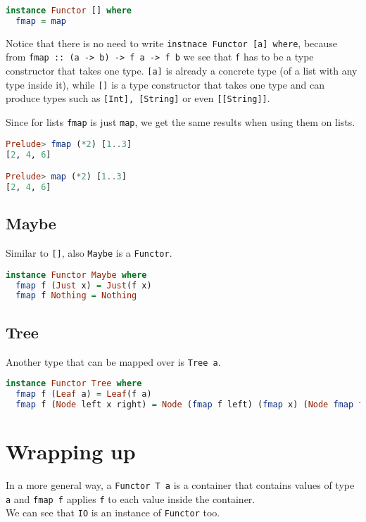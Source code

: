 \begin{lstlisting}[language=haskell]
instance Functor [] where
  fmap = map
\end{lstlisting}

Notice that there is no need to write \texttt{instnace Functor [a] where}, because from \texttt{fmap :: (a -> b) -> f a -> f b} we see that \texttt{f} has to be a type constructor that takes one type. \texttt{[a]} is already a concrete type (of a list with any type inside it), while \texttt{[]} is a type constructor that takes one type and can produce types such as \texttt{[Int], [String]} or even \texttt{[[String]]}.
\linebreak \linebreak

Since for lists \texttt{fmap} is just \texttt{map}, we get the same results when using them on lists. 

\begin{lstlisting}[language=haskell]
Prelude> fmap (*2) [1..3]
[2, 4, 6]

Prelude> map (*2) [1..3]
[2, 4, 6]
\end{lstlisting}


\subsection{Maybe}
Similar to \texttt{[]}, also \texttt{Maybe} is a \texttt{Functor}.

\begin{lstlisting}[language=haskell]
instance Functor Maybe where
  fmap f (Just x) = Just(f x)
  fmap f Nothing = Nothing 
\end{lstlisting}


\subsection{Tree}
Another type that can be mapped over is \texttt{Tree a}.

\begin{lstlisting}[language=haskell]
instance Functor Tree where
  fmap f (Leaf a) = Leaf(f a)
  fmap f (Node left x right) = Node (fmap f left) (fmap x) (Node fmap f right)
\end{lstlisting}


\section{Wrapping up}
In a more general way, a \texttt{Functor T a} is a container that contains values of type \texttt{a} and \texttt{fmap f} applies \texttt{f} to each value inside the container. \\
We can see that \texttt{IO} is an instance of \texttt{Functor} too.

